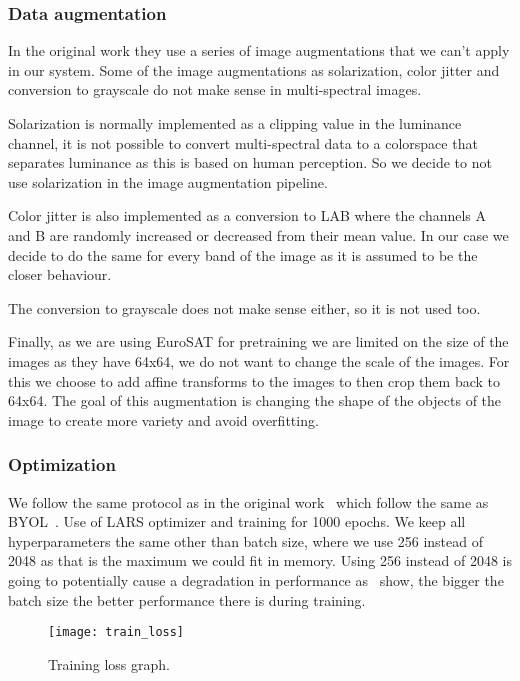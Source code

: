 \documentclass[conference]{IEEEtran}
\begin{document}
    \subsubsection{Data augmentation}
    In the original work they use a series of image augmentations that we can't apply in our system.
    Some of the image augmentations as solarization, color jitter and conversion to grayscale do not make sense in multi-spectral images.

    Solarization is normally implemented as a clipping value in the luminance channel, it is not possible to convert multi-spectral data to
    a colorspace that separates luminance as this is based on human perception.
    So we decide to not use solarization in the image augmentation pipeline.

    Color jitter is also implemented as a conversion to LAB where the channels A and B are randomly increased or decreased from their mean value.
    In our case we decide to do the same for every band of the image as it is assumed to be the closer behaviour.

    The conversion to grayscale does not make sense either, so it is not used too.

    Finally, as we are using EuroSAT for pretraining we are limited on the size of the images as they have 64x64, we do not want to change the scale of the images.
    For this we choose to add affine transforms to the images to then crop them back to 64x64.
    The goal of this augmentation is changing the shape of the objects of the image to create more variety and avoid overfitting.

    \subsubsection{Optimization}
    We follow the same protocol as in the original work~\cite{barlowtwins} which follow the same as BYOL~\cite{grill2020bootstrap}.
    Use of LARS optimizer and training for 1000 epochs.
    We keep all hyperparameters the same other than batch size, where we use 256 instead of 2048 as that is the maximum we could fit in memory.
    Using 256 instead of 2048 is going to potentially cause a degradation in performance as~\citet{grill2020bootstrap, chen2020simple, barlowtwins}
    show, the bigger the batch size the better performance there is during training.

    \begin{figure}[h]
        \centering
        \texttt{[image: train\_loss]}
        \caption{Training loss graph.}
        \label{fig:training_loss_graph}
    \end{figure}
\end{document}
